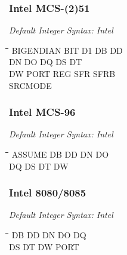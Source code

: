 \subsubsection{Intel MCS-(2)51}

{\em Default Integer Syntax: Intel}

{\tt\begin{tabbing}
\hspace{3cm}\=\hspace{3cm}\=\hspace{3cm}\=\hspace{3cm}\=\kill
BIGENDIAN  \> BIT         \> D1          \> DB          \> DD \\
DN         \> DO          \> DQ          \> DS          \> DT \\
DW         \> PORT        \> REG         \> SFR         \> SFRB \\
SRCMODE \\
\end{tabbing}}

\subsubsection{Intel MCS-96}

{\em Default Integer Syntax: Intel}

{\tt\begin{tabbing}
\hspace{3cm}\=\hspace{3cm}\=\hspace{3cm}\=\hspace{3cm}\=\kill
ASSUME     \> DB          \> DD          \> DN          \> DO \\
DQ         \> DS          \> DT          \> DW \\
\end{tabbing}}
 
\subsubsection{Intel 8080/8085}

{\em Default Integer Syntax: Intel}

{\tt\begin{tabbing}
\hspace{3cm}\=\hspace{3cm}\=\hspace{3cm}\=\hspace{3cm}\=\kill
DB         \> DD          \> DN          \> DO          \> DQ \\
DS         \> DT          \> DW          \> PORT \\
\end{tabbing}}

